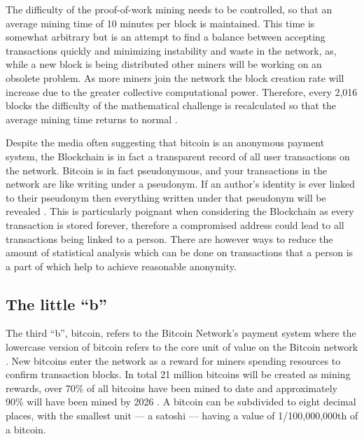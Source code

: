 \documentclass{article}
\begin{document}
The difficulty of the proof-of-work mining needs to be controlled, so that an average mining time of 10 minutes per block is maintained. This time is somewhat arbitrary but is an attempt to find a balance between accepting transactions quickly and minimizing instability and waste in the network, as, while a new block is being distributed other miners will be working on an obsolete problem. As more miners join the network the block creation rate will increase due to the greater collective computational power. Therefore, every 2,016 blocks the difficulty of the mathematical challenge is recalculated so that the average mining time returns to normal \citep{20_developer_guide_bitcoin_2016}\citep{26_blockchain_mining_-_distributed_ledgers_and_blockchain_technology_2016}.

Despite the media often suggesting that bitcoin is an anonymous payment system, the Blockchain is in fact a transparent record of all user transactions on the network. Bitcoin is in fact pseudonymous, and your transactions in the network are like writing under a pseudonym. If an author's identity is ever linked to their pseudonym then everything written under that pseudonym will be revealed \citep{28_anonymity_2016}. This is particularly poignant when considering the Blockchain as every transaction is stored forever, therefore a compromised address could lead to all transactions being linked to a person. There are however ways to reduce the amount of statistical analysis which can be done on transactions that a person is a part of which help to achieve reasonable anonymity.

\subsection{The little ``b''}

The third ``b'', bitcoin, refers to the Bitcoin Network's payment system where the lowercase version of bitcoin refers to the core unit of value on the Bitcoin network \citep{9_kaye_scholer_2016}. New bitcoins enter the network as a reward for miners spending resources to confirm transaction blocks. In total 21 million bitcoins will be created as mining rewards, over 70\% of all bitcoins have been mined to date and approximately 90\% will have been mined by 2026 \citep{9_kaye_scholer_2016}. A bitcoin can be subdivided to eight decimal places, with the smallest unit –-- a satoshi --– having a value of 1/100,000,000th of a bitcoin.
\end{document}
